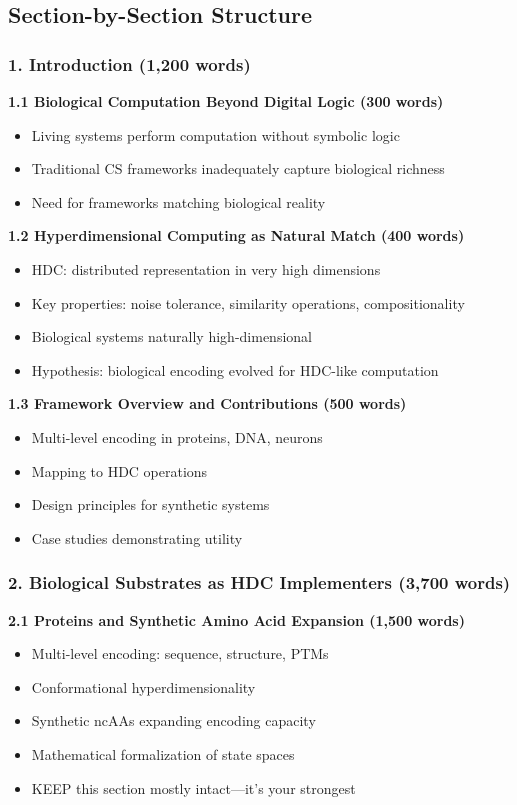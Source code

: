 \documentclass[11pt]{article}
\begin{document}
\subsection{Section-by-Section Structure}

\subsubsection{1. Introduction (1,200 words)}

\textbf{1.1 Biological Computation Beyond Digital Logic (300 words)}
\begin{itemize}
    \item Living systems perform computation without symbolic logic
    \item Traditional CS frameworks inadequately capture biological richness
    \item Need for frameworks matching biological reality
\end{itemize}

\textbf{1.2 Hyperdimensional Computing as Natural Match (400 words)}
\begin{itemize}
    \item HDC: distributed representation in very high dimensions
    \item Key properties: noise tolerance, similarity operations, compositionality
    \item Biological systems naturally high-dimensional
    \item Hypothesis: biological encoding evolved for HDC-like computation
\end{itemize}

\textbf{1.3 Framework Overview and Contributions (500 words)}
\begin{itemize}
    \item Multi-level encoding in proteins, DNA, neurons
    \item Mapping to HDC operations
    \item Design principles for synthetic systems
    \item Case studies demonstrating utility
\end{itemize}

\subsubsection{2. Biological Substrates as HDC Implementers (3,700 words)}

\textbf{2.1 Proteins and Synthetic Amino Acid Expansion (1,500 words)}
\begin{itemize}
    \item Multi-level encoding: sequence, structure, PTMs
    \item Conformational hyperdimensionality
    \item Synthetic ncAAs expanding encoding capacity
    \item Mathematical formalization of state spaces
    \item \textcolor{keep}{KEEP this section mostly intact—it's your strongest}
\end{itemize}
\end{document}

